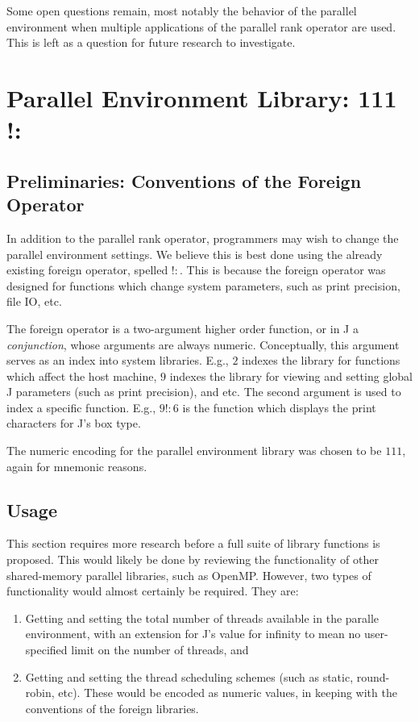 Some open questions remain, most notably 
the behavior of the parallel environment when multiple applications of the parallel rank operator are used. 
This is left as a question for future research to investigate.

\section{Parallel Environment Library: 111 !:} 
\label{pfor}
\subsection{Preliminaries: Conventions of the Foreign Operator}
In addition to the parallel rank operator, 
programmers may wish to change the parallel environment settings.
We believe this is best done using the already existing foreign operator, spelled $!:$.
This is because the foreign operator was designed for functions which change system parameters, 
such as print precision, file IO, etc.\cite{jvocab} 

The foreign operator is a two-argument higher order function, or in J a \textit{conjunction}, 
whose arguments are always numeric.
Conceptually, this argument serves as an index into system libraries.
E.g., $2$ indexes the library for functions which affect the host machine, 
$9$ indexes the library for viewing and setting global J parameters (such as print precision), and etc.
The second argument is used to index a specific function.
E.g., $9!:6$ is the function which displays the print characters for J's box type.

The numeric encoding for the parallel environment library 
was chosen to be $111$, again for mnemonic reasons.

\subsection{Usage}
This section requires more research before a full suite of library functions is proposed.
This would likely be done by reviewing the functionality of other shared-memory parallel libraries, such as OpenMP. %
However, two types of functionality would almost certainly be required.
They are:

\begin{enumerate}
    \item Getting and setting the total number of threads available in the paralle environment,
        with an extension for J's value for infinity to mean no user-specified limit on the number of threads, and
    \item Getting and setting the thread scheduling schemes (such as static, round-robin, etc).
        These would be encoded as numeric values, in keeping with the conventions of the foreign libraries.
\end{enumerate}
